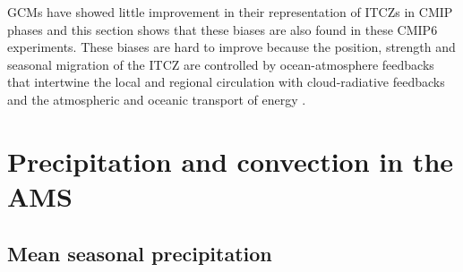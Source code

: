 GCMs have showed little improvement in their representation of ITCZs in CMIP phases\citep{oueslati2015} and this section shows that these biases are also found in these CMIP6 experiments. These biases are hard to improve because the position, strength and seasonal migration of the ITCZ are controlled by ocean-atmosphere feedbacks that intertwine the local and regional circulation with cloud-radiative feedbacks and the atmospheric and oceanic transport of energy \citep{schneider2014,oueslati2015,byrne2016,byrne2020}. 



\section{Precipitation and convection in the AMS}\label{sq:precip}

\subsection{Mean seasonal precipitation}

